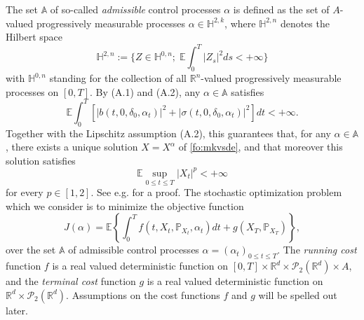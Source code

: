 \documentclass[11pt]{amsart}
\begin{document}
The set ${\mathbb A}$ of so-called \textit{admissible} control processes $ \alpha$ is defined as the set of $A$-valued progressively measurable processes $\alpha \in {\mathbb H}^{2,k}$, where ${\mathbb H}^{2,n}$ denotes the Hilbert space
$$
{\mathbb H}^{2,n}:=\Big\{Z\in{\mathbb H}^{0,n};\;{\mathbb E}\int_0^T|Z_s|^2ds<+\infty\Big\}
$$
with ${\mathbb H}^{0,n}$ standing for the collection of all ${\mathbb R}^n$-valued progressively measurable processes on $[0,T]$. By (A.1) and (A.2), any $\alpha \in {\mathbb A}$ satisfies 
$$
{\mathbb E}\int_0^T[|b(t,0,\delta_0,\alpha_t)|^2+|\sigma(t,0,\delta_0,\alpha_t)|^2]dt<+\infty. 
$$
Together with the Lipschitz assumption (A.2), this guarantees that, for any $\alpha\in{\mathbb A}$, there exists a unique solution $ X= X^{\alpha}$ of 
\eqref{fo:mkvsde}, and that moreover this solution satisfies
\begin{equation}
\label{fo:moment}
{\mathbb E}\sup_{0\le t\le T}|X_t|^p<+ \infty
\end{equation}
for every $p \in [1,2]$. See e.g. \cite{Sznitman,JourdainMeleardWoyczynski} for a proof.
\vskip 2pt
The stochastic optimization problem which we consider is to minimize the objective function
\begin{equation}
\label{fo:mkvobjective}
J(\alpha)={\mathbb E}\left\{\int_0^Tf(t,X_t,{{\mathbb P}_{X_t}}, \alpha_t)dt+g(X_T,{{\mathbb P}_{X_T}})\right\}  ,
\end{equation}
over the set ${\mathbb A}$ of admissible control processes $\alpha=(\alpha_t)_{0\le t\le T}$. The \emph{running cost} function $f$ is a real valued deterministic function on $[0,T]\times{\mathbb R}^d\times {\mathcal P}_2({\mathbb R}^d)\times A$, and the  \emph{terminal cost} function $g$ is a real valued deterministic function on ${\mathbb R}^d\times {\mathcal P}_2({\mathbb R}^d)$. Assumptions on the cost functions $f$ and $g$ will be spelled out later.
\end{document}
